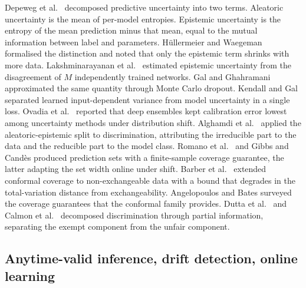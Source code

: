 \documentclass[acmsmall,nonacm,review,anonymous]{acmart}
\newcommand{\1}[1]{\mathbf{1}\!\left\{#1\right\}}
\begin{document}
Depeweg et al.\ \cite{depeweg2018} decomposed predictive uncertainty into two terms. Aleatoric uncertainty is the mean of per-model entropies. Epistemic uncertainty is the entropy of the mean prediction minus that mean, equal to the mutual information between label and parameters. H{\"u}llermeier and Waegeman \cite{hullermeier2021} formalised the distinction and noted that only the epistemic term shrinks with more data. Lakshminarayanan et al.\ \cite{lakshminarayanan2017} estimated epistemic uncertainty from the disagreement of $M$ independently trained networks. Gal and Ghahramani \cite{gal2016} approximated the same quantity through Monte Carlo dropout. Kendall and Gal \cite{kendall2017} separated learned input-dependent variance from model uncertainty in a single loss. Ovadia et al.\ \cite{ovadia2019} reported that deep ensembles kept calibration error lowest among uncertainty methods under distribution shift. Alghamdi et al.\ \cite{alghamdi2023} applied the aleatoric-epistemic split to discrimination, attributing the irreducible part to the data and the reducible part to the model class. Romano et al.\ \cite{romano2020} and Gibbs and Cand{\`e}s \cite{gibbs2021} produced prediction sets with a finite-sample coverage guarantee, the latter adapting the set width online under shift. Barber et al.\ \cite{barber2023} extended conformal coverage to non-exchangeable data with a bound that degrades in the total-variation distance from exchangeability. Angelopoulos and Bates \cite{angelopoulos2021} surveyed the coverage guarantees that the conformal family provides. Dutta et al.\ \cite{dutta2020} and Calmon et al.\ \cite{calmon2018} decomposed discrimination through partial information, separating the exempt component from the unfair component.

\subsection{Anytime-valid inference, drift detection, online learning}
\end{document}
